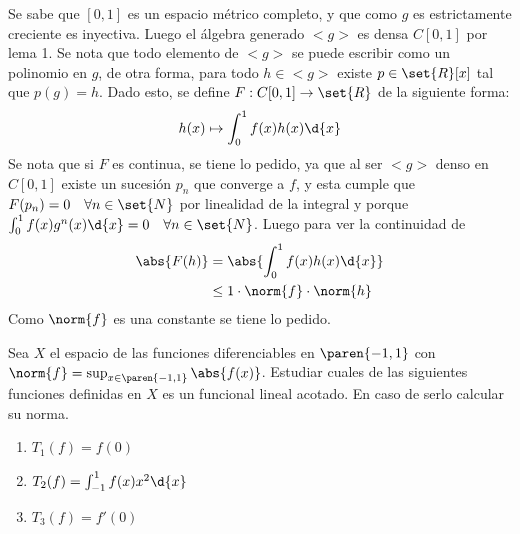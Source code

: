 \begin{sol}
    Se sabe que \([0,1]\) es un espacio métrico completo, y que como \(g\) es estrictamente creciente es inyectiva. Luego el álgebra generado \(<g>\) es densa \(C[0,1]\) por lema 1. Se nota que todo elemento de \(<g>\) se puede escribir como un polinomio en \(g\), de otra forma, para todo \(h\in<g>\) existe \(p\in\set{R}[x]\) tal que \(p(g)=h\). Dado esto, se define \(F:C[0,1]\rightarrow\set{R}\) de la siguiente forma:
    \[
        h(x)\mapsto\int_0^1f(x)h(x)\d{x}
    \]
    Se nota que si \(F\) es continua, se tiene lo pedido, ya que al ser \(<g>\) denso en \(C[0,1]\) existe un sucesión \(p_n\) que converge a \(f\), y esta cumple que \(F(p_n)=0\quad\forall n\in\set{N}\) por linealidad de la integral y porque \(\int_0^1f(x)g^n(x)\d{x}=0\quad\forall n\in\set{N}\). Luego para ver la continuidad de
    \begin{align*}
        \abs{F(h)} & =\abs{\int_0^1f(x)h(x)\d{x}} \\
                   & \leq 1\cdot\norm{f}\cdot\norm{h}\\
    \end{align*}
    Como \(\norm{f}\) es una constante se tiene lo pedido.
\end{sol}

\begin{prob}
    Sea \(X\) el espacio de las funciones diferenciables en \(\paren{-1,1}\) con \(\norm{f}=\sup_{x\in\paren{-1,1}}\abs{f(x)}\). Estudiar cuales de las siguientes funciones definidas en \(X\) es un funcional lineal acotado. En caso de serlo calcular su norma.
    \begin{enumerate}
        \item \(T_1(f)=f(0)\)
        \item \(T_2(f)=\int_{-1}^1f(x)x^2\d{x}\)
        \item \(T_3(f)=f'(0)\)
    \end{enumerate}
\end{prob}

